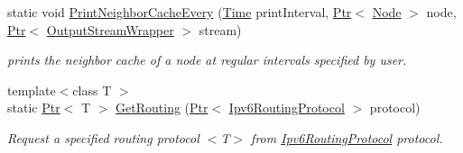 \begin{DoxyCompactItemize}
static void \hyperlink{classns3_1_1Ipv6RoutingHelper_ac904dfdcd8d047f61fd20cec6ee73cda}{Print\+Neighbor\+Cache\+Every} (\hyperlink{classns3_1_1Time}{Time} print\+Interval, \hyperlink{classns3_1_1Ptr}{Ptr}$<$ \hyperlink{classns3_1_1Node}{Node} $>$ node, \hyperlink{classns3_1_1Ptr}{Ptr}$<$ \hyperlink{classns3_1_1OutputStreamWrapper}{Output\+Stream\+Wrapper} $>$ stream)
\begin{DoxyCompactList}\small\item\em prints the neighbor cache of a node at regular intervals specified by user. \end{DoxyCompactList}\item 
{\footnotesize template$<$class T $>$ }\\static \hyperlink{classns3_1_1Ptr}{Ptr}$<$ T $>$ \hyperlink{classns3_1_1Ipv6RoutingHelper_a22afb76ebdd74e8ccecace410c9c3ff7}{Get\+Routing} (\hyperlink{classns3_1_1Ptr}{Ptr}$<$ \hyperlink{classns3_1_1Ipv6RoutingProtocol}{Ipv6\+Routing\+Protocol} $>$ protocol)
\begin{DoxyCompactList}\small\item\em Request a specified routing protocol $<$T$>$ from \hyperlink{classns3_1_1Ipv6RoutingProtocol}{Ipv6\+Routing\+Protocol} protocol. \end{DoxyCompactList}\end{DoxyCompactItemize}
